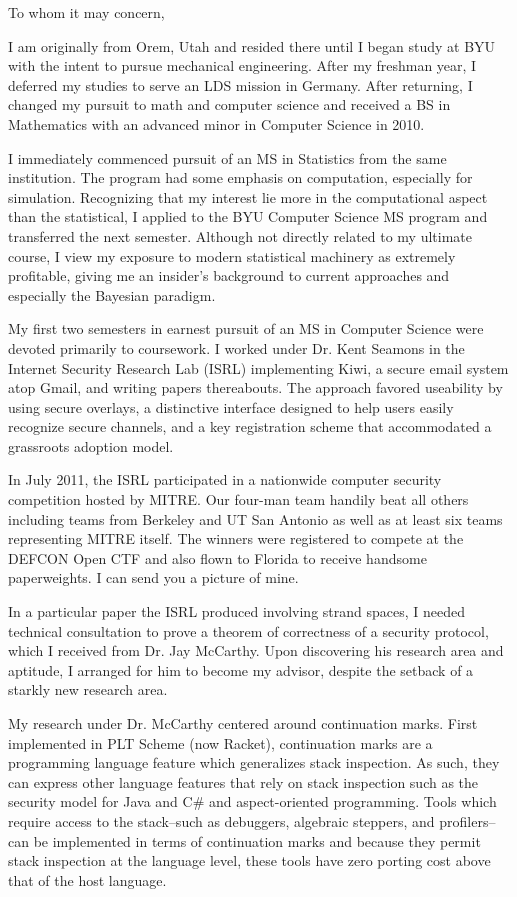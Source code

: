 \documentclass{letter}
\begin{document}
\begin{letter}
\opening{To whom it may concern,}

I am originally from Orem, Utah and resided there until I began study at BYU with the 
intent to pursue mechanical engineering. After my freshman year, I deferred my studies 
to serve an LDS mission in Germany. After returning, I changed my pursuit to math and 
computer science and received a BS in Mathematics with an advanced minor in Computer 
Science in 2010.

I immediately commenced pursuit of an MS 
in Statistics from the same institution. The program had some emphasis on computation, 
especially for simulation. Recognizing that my interest lie more in the computational 
aspect than the statistical, I applied to the BYU Computer Science MS program and transferred the next 
semester. Although not directly related to my ultimate course, I view my exposure to 
modern statistical machinery as extremely profitable, giving me an insider's background 
to current approaches and especially the Bayesian paradigm.

My first two semesters in earnest pursuit of an MS in Computer Science were devoted 
primarily to coursework. I worked under Dr. Kent Seamons in the Internet Security Research
Lab (ISRL) implementing Kiwi, a secure email system atop Gmail, and writing papers thereabouts. 
The approach favored useability by using secure overlays, a distinctive interface designed 
to help users easily recognize secure channels, and a key registration scheme that 
accommodated a grassroots adoption model.

In July 2011, the ISRL participated in a nationwide computer security competition hosted by MITRE. Our 
four-man team handily beat all others including teams from Berkeley and UT San Antonio as well 
as at least six teams representing MITRE itself. The winners were registered to compete at the 
DEFCON Open CTF and also flown to Florida to receive handsome paperweights. I can send you a 
picture of mine.

In a particular paper the ISRL produced involving strand spaces, I needed technical consultation 
to prove a theorem of correctness of a security protocol, which I received from Dr. Jay McCarthy. 
Upon discovering his research area and aptitude, I arranged for him to become my advisor, despite 
the setback of a starkly new research area.

My research under Dr. McCarthy centered around continuation marks. First implemented in PLT 
Scheme (now Racket), continuation marks are a programming language feature which generalizes 
stack inspection. As such, they can express other language features that rely on stack inspection 
such as the security model for Java and C\# and aspect-oriented programming. Tools which require 
access to the stack--such as debuggers, algebraic steppers, and profilers--can be implemented in 
terms of continuation marks and because they permit stack inspection at the language level, these 
tools have zero porting cost above that of the host language.


\end{letter}
\end{document}
